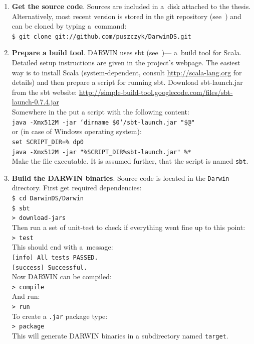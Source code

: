 \begin{enumerate}

\item \textbf{Get the source code}. Sources are included in a~disk attached to
  the thesis. Alternatively, most recent version is stored in the git
  repository (see~\cite{Loe09})  and can be cloned by typing a~command:\\
  \texttt{\$ git clone git://github.com/puszczyk/DarwinDS.git}
\item \textbf{Prepare a build tool}. DARWIN uses sbt (see~\cite{sbt10})---
  a~build tool for Scala. Detailed setup instructions are given in the
  project's webpage. The easiest way is to install Scala (system-dependent,
  consult \url{http://scala-lang.org} for details) and then prepare a script
  for running sbt. Download sbt-launch.jar from the sbt website:
  \url{http://simple-build-tool.googlecode.com/files/sbt-launch-0.7.4.jar}
  \\
  Somewhere in the  put a script with the following content: \\
  \texttt{java -Xmx512M -jar `dirname \$0`/sbt-launch.jar "\$@"} \\
  or (in case of Windows operating system): \\
  \texttt{set SCRIPT\_DIR=\%~dp0} \\
  \texttt{java -Xmx512M -jar "\%SCRIPT\_DIR\%sbt-launch.jar" \%*} \\
  Make the file executable. It is assumed further, that the script is named
  \texttt{sbt}.
\item \textbf{Build the DARWIN binaries}. Source code is located in the
  \texttt{Darwin} directory. First get required dependencies: \\
  \texttt{\$ cd DarwinDS/Darwin} \\
  \texttt{\$ sbt} \\
  \texttt{> download-jars} \\
  Then run a set of unit-test to check if everything went fine up to this
  point:\\
  \texttt{> test} \\
  This should end with a~message: \\
  \texttt{[info] All tests PASSED.} \\
  \texttt{[success] Successful.} \\
  Now DARWIN can be compiled: \\
  \texttt{> compile} \\
  And run: \\
  \texttt{> run} \\
  To create a \texttt{.jar} package type: \\
  \texttt{> package} \\
  This will generate DARWIN binaries in a subdirectory named \texttt{target}.
\end{enumerate}



